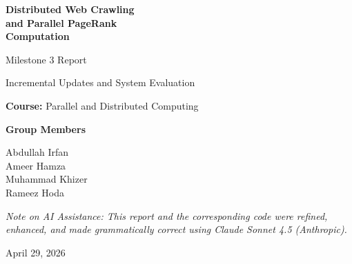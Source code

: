 \documentclass[11pt,a4paper]{article}
\title{}
\date{}
\begin{document}
\begin{titlepage}
\begin{center}
\vspace*{2cm}

{\Huge\bfseries Distributed Web Crawling \\[0.4cm]
and Parallel PageRank \\[0.4cm]
Computation\par}

\vspace{1.2cm}

{\LARGE Milestone 3 Report\par}
\vspace{0.4cm}
{\Large Incremental Updates and System Evaluation\par}

\vspace{1.5cm}

{\large \textbf{Course:} Parallel and Distributed Computing\par}

\vspace{2cm}

{\large \textbf{Group Members}\par}
\vspace{0.5cm}
{\large
Abdullah Irfan \\[0.2cm]
Ameer Hamza \\[0.2cm]
Muhammad Khizer \\[0.2cm]
Rameez Hoda \par
}

\vfill

\begin{minipage}{0.9\linewidth}
\centering
\textit{Note on AI Assistance: This report and the corresponding code were
refined, enhanced, and made grammatically correct using Claude Sonnet 4.5
(Anthropic).}
\end{minipage}

\vspace{1cm}

{\large April 29, 2026\par}
\end{center}
\end{titlepage}

\tableofcontents
\clearpage
\end{document}
